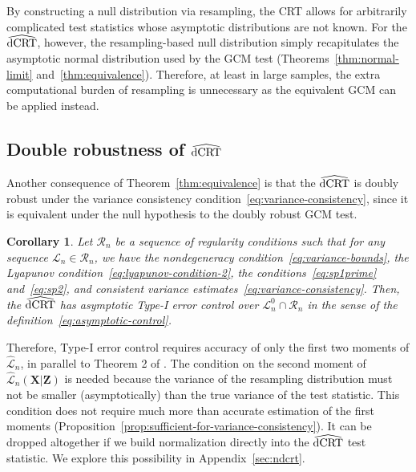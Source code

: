 \documentclass[12pt]{article}
\newtheorem{corollary}{Corollary}
\theoremstyle{definition}
\theoremstyle{remark}
\newcommand\linktoproof[1]{ {\normalfont[{\hyperlink{#1}{Proof}}]} }
\newcommand{\V}{\mathrm{Var}}							%
\renewcommand{\P}{\mathbb{P}}							%
\newcommand{\prx}{\bm X}								%
\newcommand{\srx}{X}									%
\newcommand{\prz}{\bm Z}								%
\newcommand{\srz}{Z}									%
\newcommand{\sry}{Y}									%
\newcommand{\law}{\mathcal L}							%
\newcommand{\nulllaws}{\mathscr L^0}					%
\newcommand{\regclass}{\mathscr R}					    %
\newcommand{\lawhat}{\widehat{\mathcal L}}				%
\newcommand{\dCRThat}{\widehat{\textnormal{dCRT}}}		%
\begin{document}
	By constructing a null distribution via resampling, the CRT allows for arbitrarily complicated test statistics whose asymptotic distributions are not known. For the $\dCRThat$, however, the resampling-based null distribution simply recapitulates the asymptotic normal distribution used by the GCM test (Theorems~\ref{thm:normal-limit} and~\ref{thm:equivalence}). Therefore, at least in large samples, the extra computational burden of resampling is unnecessary as the equivalent GCM can be applied instead.
	
	\subsection{Double robustness of $\dCRThat$}
	
	Another consequence of Theorem~\ref{thm:equivalence} is that the $\dCRThat$ is doubly robust under the variance consistency condition~\eqref{eq:variance-consistency}, since it is equivalent under the null hypothesis to the doubly robust GCM test. %
	
	\begin{corollary} \label{cor:dcrt-double-robustness} \linktoproof{proof:cor:dcrt-double-robustness}
		Let $\regclass_n$ be a sequence of regularity conditions such that for any sequence $\law_n \in \regclass_n$, we have the nondegeneracy condition~\eqref{eq:variance-bounds}, the Lyapunov condition~\eqref{eq:lyapunov-condition-2}, the conditions~\eqref{eq:sp1prime} and~\eqref{eq:sp2}, and consistent variance estimates~\eqref{eq:variance-consistency}. Then, the $\dCRThat$ has asymptotic Type-I error control over $\nulllaws_n \cap \regclass_n$ in the sense of the definition~\eqref{eq:asymptotic-control}.
	\end{corollary}
	
	Therefore, Type-I error control requires accuracy of only the first two moments of $\lawhat_n$, in parallel to Theorem 2 of \citet{Katsevich2020a}. The condition on the second moment of $\lawhat_n(\prx|\prz)$ is needed because the variance of the resampling distribution must not be smaller (asymptotically) than the true variance of the test statistic. This condition does not require much more than accurate estimation of the first moments (Proposition~\ref{prop:sufficient-for-variance-consistency}). It can be dropped altogether if we build normalization directly into the $\dCRThat$ test statistic. We explore this possibility in Appendix~\ref{sec:ndcrt}.
	
\end{document}
